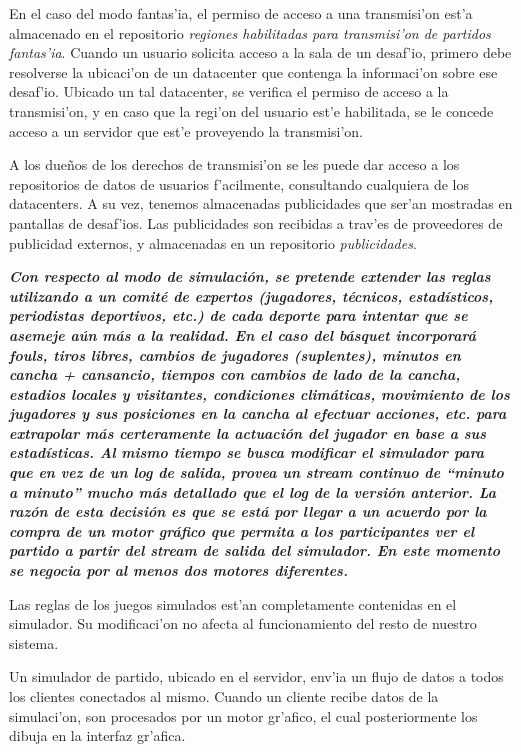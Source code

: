 En el caso del modo fantas'ia, el permiso de acceso a una transmisi'on est'a almacenado en el repositorio \textit{regiones habilitadas para transmisi'on de partidos fantas'ia}. Cuando un usuario solicita acceso a la sala de un desaf'io, primero debe resolverse la ubicaci'on de un datacenter que contenga la informaci'on sobre ese desaf'io. Ubicado un tal datacenter, se verifica el permiso de acceso a la transmisi'on, y en caso que la regi'on del usuario est'e habilitada, se le concede acceso a un servidor que est'e proveyendo la transmisi'on.

A los due\~nos de los derechos de transmisi'on se les puede dar acceso a los repositorios de datos de usuarios f'acilmente, consultando cualquiera de los datacenters. A su vez, tenemos almacenadas publicidades que ser'an mostradas en pantallas de desaf'ios. Las publicidades son recibidas a trav'es de proveedores de publicidad externos, y almacenadas en un repositorio \textit{publicidades}.

\textbf{\textit{
Con respecto al modo de simulación, se pretende extender las reglas utilizando a un comité de expertos (jugadores, técnicos, estadísticos, periodistas deportivos, etc.) de cada deporte para intentar que se asemeje aún más a la realidad. En el caso del básquet incorporará fouls, tiros libres, cambios de jugadores (suplentes), minutos en cancha + cansancio, tiempos con cambios de lado de la cancha, estadios locales y visitantes, condiciones climáticas, movimiento de los jugadores y sus posiciones en la cancha al efectuar acciones, etc. para extrapolar más certeramente la actuación del jugador en base a sus estadísticas.
Al mismo tiempo se busca modificar el simulador para que en vez de un log de salida, provea un stream continuo de “minuto a minuto” mucho más detallado que el log de la versión anterior. La razón de esta decisión es que se está por llegar a un acuerdo por la compra de un motor gráfico que permita a los participantes ver el partido a partir del stream de salida del simulador. En este momento se negocia por al menos dos motores diferentes.
}}

Las reglas de los juegos simulados est'an completamente contenidas en el simulador. Su modificaci'on no afecta al funcionamiento del resto de nuestro sistema.

Un simulador de partido, ubicado en el servidor, env'ia un flujo de datos a todos los clientes conectados al mismo. Cuando un cliente recibe datos de la simulaci'on, son procesados por un motor gr'afico, el cual posteriormente los dibuja en la interfaz gr'afica.

